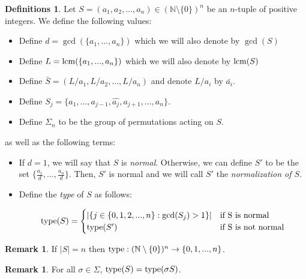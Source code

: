 \documentclass[12pt]{amsart}
\theoremstyle{plain}
\theoremstyle{definition}
\newtheorem{definitions}[subsection]{Definitions}
\newtheorem{remark}[subsection]{Remark}
\newcommand{\lcm}{		\operatorname{{\rm lcm}}}
\newcommand{\type}{		\operatorname{{\rm type}}}
\newcommand{\Nat}{\ensuremath{\mathbb{N}}}
\begin{document}
\begin{definitions}	\label{typeDef}
	Let $S = (a_1, a_2, ..., a_n) \in (\Nat \setminus\{0\})^n$ be an $n$-tuple of positive integers. We define the following values:
	
	\begin{itemize}
		\item Define $d = \gcd(\{a_1,...,a_n\})$ which we will also denote by $\gcd(S)$ 
		\item Define $L = \lcm(\{a_1, ..., a_n\})$ which we will also denote by $\lcm(S)$
		\item Define $\bar{S} = (L/a_1, L/a_2,..., L/a_n)$ and denote $L/a_i$ by $\bar{a_i}$. 
		\item Define $S_j = \{a_1, ..., a_{j-1}, \hat{a_j}, a_{j+1}, ..., a_n\}$.
		
		\item Define $\Sigma_n$ to be the group of permutations acting on $S$.  
	\end{itemize}

	as well as the following terms:
	
	\begin{itemize}
		\item If $d = 1$, we will say that $S$ is \textit{normal}. Otherwise, we can define $S'$ to be the set $\{\frac{a_1}{d}, ... , \frac{a_n}{d}\}$. Then, $S'$ is normal and we will call $S'$ the \textit{normalization of $S$}.
		
		
		
		\item Define the \textit{type} of $S$ as follows:
		
		\begin{equation}
		\type(S) = 
		\begin{cases}
		|\{j \in \{0,1,2,...,n\} : \gcd(S_j) > 1\}| & \text{if S is normal}\\
		\type(S') & \text{if S is not normal}
		\end{cases}
		\end{equation}
	\end{itemize}  

	  	
\end{definitions}

\begin{remark}
	
	If $|S| = n$ then $\type : (\Nat \setminus \{0\})^n \to \{0,1,...,n\}$. 
\end{remark}
\begin{remark}
	For all $\sigma \in \Sigma$, $\type(S) = \type(\sigma S) $. 
\end{remark}
\end{document}
